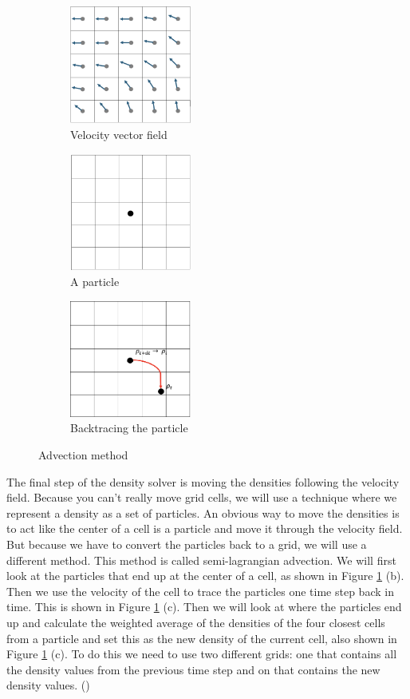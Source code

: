 \documentclass[a4paper,12pt]{article}
\begin{document}
\begin{figure}[H]
	\centering
	\begin{subfigure}{0.3\textwidth}
		\centering
		\includegraphics[width=4cm]{resources/advection1.png}
		\caption{Velocity vector field}
	\end{subfigure}%
	\begin{subfigure}{0.3\textwidth}
		\centering
		\includegraphics[width=4cm]{resources/advection2.png}
		\caption{A particle}
	\end{subfigure}
	\begin{subfigure}{0.3\textwidth}
		\centering
		\includegraphics[width=4cm]{resources/advection3.png}
		\caption{Backtracing the particle}
	\end{subfigure}
	\caption {Advection method}
	\label{fig:advection}
\end{figure}

The final step of the density solver is moving the densities following the velocity field.
Because you can't really move grid cells, we will use a technique where we represent a density as a set of particles.
An obvious way to move the densities is to act like the center of a cell is a particle and move it through the velocity field.
But because we have to convert the particles back to a grid, we will use a different method. 
This method is called semi-lagrangian advection.
We will first look at the particles that end up at the center of a cell, as shown in Figure \ref{fig:advection} (b). Then we use the velocity of the cell to trace the particles one time step back in time. This is shown in Figure \ref{fig:advection} (c).
Then we will look at where the particles end up and calculate the weighted average of the densities of the four closest cells from a particle and set this as the new density of the current cell, also shown in Figure \ref{fig:advection} (c).
To do this we need to use two different grids: one that contains all the density values from the previous time step
and on that contains the new density values. (\cite{josstam})
 
\end{document}
